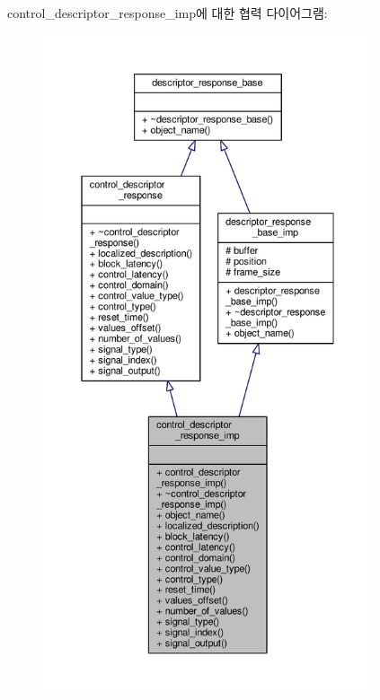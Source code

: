 control\+\_\+descriptor\+\_\+response\+\_\+imp에 대한 협력 다이어그램\+:
\nopagebreak
\begin{figure}[H]
\begin{center}
\leavevmode
\includegraphics[height=550pt]{classavdecc__lib_1_1control__descriptor__response__imp__coll__graph}
\end{center}
\end{figure}
